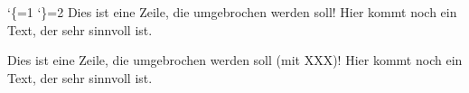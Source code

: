 %
%
%
\catcode`\{=1 %
\catcode`\}=2 %
%
%
\hsize=2in
Dies ist eine Zeile, die umgebrochen werden soll! Hier kommt noch ein Text, der sehr sinnvoll ist.



Dies ist eine Zeile, die umgebrochen werden soll (mit XXX)! Hier kommt noch ein Text, der sehr sinnvoll ist.

